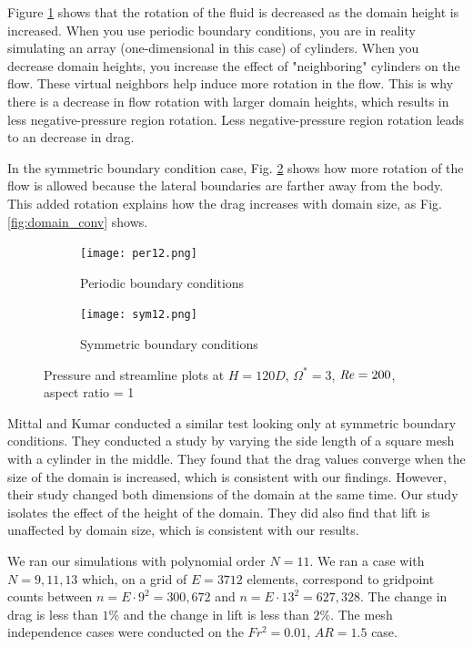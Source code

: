 Figure \ref{fig:per12} shows that the rotation of the fluid is decreased as the domain height is increased. When you use periodic boundary conditions, you are in reality simulating an array (one-dimensional in this case) of cylinders. When you decrease domain heights, you increase the effect of "neighboring" cylinders on the flow. These virtual neighbors help induce more rotation in the flow. This is why there is a decrease in flow rotation with larger domain heights, which results in less negative-pressure region rotation. Less negative-pressure region rotation leads to an decrease in drag.  

In the symmetric boundary condition case, Fig. \ref{fig:sym12} shows how more rotation of the flow is allowed because the lateral boundaries are farther away from the body. This added rotation explains how the drag increases with domain size, as Fig. \ref{fig:domain_conv} shows.  
\begin{figure}
    \centering
    \begin{subfigure}{0.49\textwidth}
    \texttt{[image: per12.png]}
    \caption{Periodic boundary conditions}
    \label{fig:per12}
    \end{subfigure}
    \begin{subfigure}{0.49\textwidth}
    \texttt{[image: sym12.png]}
    \caption{Symmetric boundary conditions}
    \label{fig:sym12}
    \end{subfigure}
    \caption{Pressure and streamline plots at $H=120D$, $\Omega^{\ast} = 3$, $\mathit{Re} = 200$, aspect ratio = 1}
    \label{fig:per sym12}
\end{figure}

Mittal and Kumar \cite{mittal_flow_2003} conducted a similar test looking only at symmetric boundary conditions. They conducted a study by varying the side length of a square mesh with a cylinder in the middle. They found that the drag values converge when the size of the domain is increased, which is consistent with our findings. However, their study changed both dimensions of the domain at the same time. Our study isolates the effect of the height of the domain. They did also find that lift is unaffected by domain size, which is consistent with our results. 

We ran our simulations with polynomial order $N = 11$. We ran a case with $N = 9, 11, 13$ which, on a grid of $E = 3712$ elements, correspond to gridpoint counts between $n = E \cdot 9^2 = 300,672$ and $n = E \cdot 13^2 = 627,328$. The change in drag is less than $1\%$ and the change in lift is less than $2\%$. The mesh independence cases were conducted on the $Fr^2 = 0.01$, $AR = 1.5$ case.

